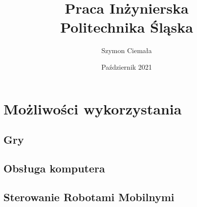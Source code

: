 \documentclass[a4paper,12pt]{report}
\title{Praca Inżynierska\\{\Large Politechnika Śląska}}
\author{Szymon Ciemała}
\date{Październik 2021}
\begin{document}
\maketitle

\tableofcontents








\chapter{Możliwości wykorzystania}
\section{Gry}
\section{Obsługa komputera}
\section{Sterowanie Robotami Mobilnymi}
\end{document}

